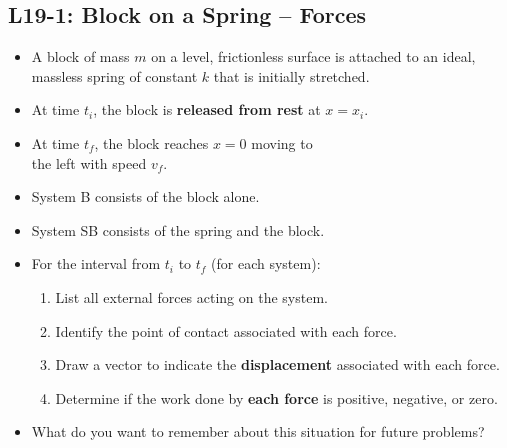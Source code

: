 \documentclass[]{article}
\newcommand{\Week}{19}
\begin{document}
\begin{PresentSpace}
\vspace{-10pt}
\section*{L\Week-1: Block on a Spring -- Forces}
\vspace{-10pt}
\begin{itemize}
	\large
	\item A block of mass $m$ on a level, frictionless surface is attached to an ideal, massless spring of constant $k$ that is initially stretched.
	\item At time $t_{i}$, the block is \textbf{released from rest} at $x=x_{i}$.
	\item At time $t_{f}$, the block reaches $x=0$ moving to \\
	the left with speed $v_{f}$.
	\item System B consists of the block alone.
	\item System SB consists of the spring and the block.
	\item For the interval from $t_{i}$ to $t_{f}$ (for each system):
	\begin{enumerate}[(1)]
		\normalsize
		\item List all external forces acting on the system.
		\item Identify the point of contact associated with each force.
		\item Draw a vector to indicate the \textbf{displacement} associated with each force.
		\item Determine if the work done by \textbf{each force} is positive, negative, or zero.
	\end{enumerate}
	\item What do you want to remember about this situation for future problems?
\end{itemize}
\end{PresentSpace}
\end{document}

